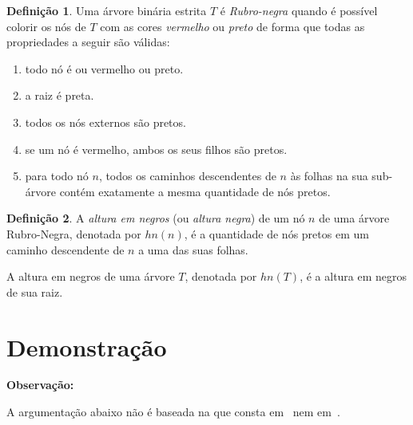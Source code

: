 \documentclass[11pt,twoside]{article}
\theoremstyle{definition}
\newtheorem{definition}{Definição}[section]
\begin{document}
\begin{definition}
	Uma árvore binária estrita \( T \) é \emph{Rubro-negra} quando é possível colorir os nós de \( T \) com as cores \emph{vermelho} ou \emph{preto} de forma que todas as propriedades a seguir são válidas:
	\begin{enumerate}[label=(\alph*)]
		\item todo nó é ou vermelho ou preto.
		\item a raiz é preta.
		\item todos os nós externos são pretos.
		\item se um nó é vermelho, ambos os seus filhos são pretos.
		\item para todo nó \( n \), todos os caminhos descendentes de \( n \) às folhas na sua sub-árvore contém exatamente a mesma quantidade de nós pretos.
	\end{enumerate}
\end{definition}

\begin{definition}
	A \emph{altura em negros} (ou \emph{altura negra}) de um nó \( n \) de uma árvore Rubro-Negra, denotada por \( hn(n) \), é a quantidade de nós pretos em um caminho descendente de \( n \) a uma das suas folhas.

	A altura em negros de uma árvore \( T \), denotada por \( hn(T) \), é a altura em negros de sua raiz.
\end{definition}

\section{Demonstração}

\begin{framed}
	{\bfseries Observação:}

	A argumentação abaixo não é baseada na que consta em~\textcite{Szwarcfiter2010} nem em~\textcite{Cormen2009}.
\end{framed}



\printbibliography
\end{document}
